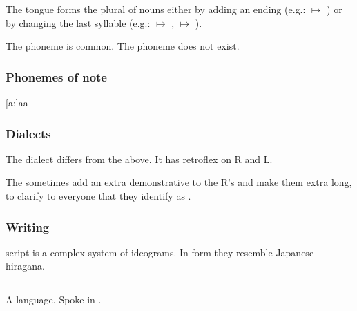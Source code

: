 The \Resphan{} tongue forms the plural of nouns either by adding an ending (e.g.: \ghobal{} $\mapsto$ \ghobaleth) or by changing the last syllable (e.g.: \resphan{} $\mapsto$ \resphain, \sathariah{} $\mapsto$ \satharioth). 

The phoneme \txipa{[T]} is common. 
The phoneme \txipa{[p]} does not exist. 









\begin{pronunciationenvironment}{\subsubsection{Phonemes of note}}
  \pitem{\ahresphan}   {[a:]}{aa}
  \pitem{\aflatresphan}{[\ae]}{\aumlaut}
\end{pronunciationenvironment}





\subsubsection{Dialects}
The \Mystraacht{} dialect differs from the above. 
It has retroflex on R and L. 

The \CiriathSepher{} sometimes add an extra demonstrative  to the R's and make them extra long, to clarify to everyone that they identify as \CiriathSepher. 





\subsubsection{Writing}
\Resphan{} script is a complex system of ideograms. 
In form they resemble Japanese hiragana. 









\subsection{\Saphyr}
\index{\Saphyr}
A \caisith language. 
Spoke in . 









